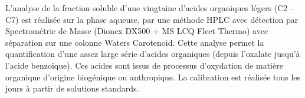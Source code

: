 L’analyse de la fraction soluble d’une vingtaine d’acides organiques légers (C2 – C7) est
réalisée sur la phase aqueuse, par une méthode HPLC avec détection par Spectrométrie de
Masse (Dionex DX500 + MS LCQ Fleet Thermo) avec séparation sur une colonne Waters
Carotenoid. Cette analyse permet la quantification d’une assez large série d'acides
organiques (depuis l’oxalate jusqu’à l’acide benzoïque). Ces acides sont issus de
processus d’oxydation de matière organique d’origine biogénique ou anthropique. La
calibration est réalisée tous les jours à partir de solutions standards.




